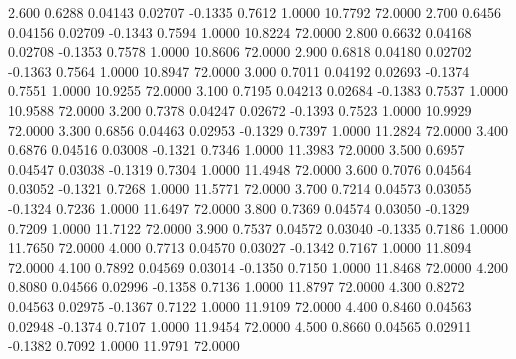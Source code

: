    2.600   0.6288   0.04143   0.02707  -0.1335   0.7612   1.0000  10.7792  72.0000
   2.700   0.6456   0.04156   0.02709  -0.1343   0.7594   1.0000  10.8224  72.0000
   2.800   0.6632   0.04168   0.02708  -0.1353   0.7578   1.0000  10.8606  72.0000
   2.900   0.6818   0.04180   0.02702  -0.1363   0.7564   1.0000  10.8947  72.0000
   3.000   0.7011   0.04192   0.02693  -0.1374   0.7551   1.0000  10.9255  72.0000
   3.100   0.7195   0.04213   0.02684  -0.1383   0.7537   1.0000  10.9588  72.0000
   3.200   0.7378   0.04247   0.02672  -0.1393   0.7523   1.0000  10.9929  72.0000
   3.300   0.6856   0.04463   0.02953  -0.1329   0.7397   1.0000  11.2824  72.0000
   3.400   0.6876   0.04516   0.03008  -0.1321   0.7346   1.0000  11.3983  72.0000
   3.500   0.6957   0.04547   0.03038  -0.1319   0.7304   1.0000  11.4948  72.0000
   3.600   0.7076   0.04564   0.03052  -0.1321   0.7268   1.0000  11.5771  72.0000
   3.700   0.7214   0.04573   0.03055  -0.1324   0.7236   1.0000  11.6497  72.0000
   3.800   0.7369   0.04574   0.03050  -0.1329   0.7209   1.0000  11.7122  72.0000
   3.900   0.7537   0.04572   0.03040  -0.1335   0.7186   1.0000  11.7650  72.0000
   4.000   0.7713   0.04570   0.03027  -0.1342   0.7167   1.0000  11.8094  72.0000
   4.100   0.7892   0.04569   0.03014  -0.1350   0.7150   1.0000  11.8468  72.0000
   4.200   0.8080   0.04566   0.02996  -0.1358   0.7136   1.0000  11.8797  72.0000
   4.300   0.8272   0.04563   0.02975  -0.1367   0.7122   1.0000  11.9109  72.0000
   4.400   0.8460   0.04563   0.02948  -0.1374   0.7107   1.0000  11.9454  72.0000
   4.500   0.8660   0.04565   0.02911  -0.1382   0.7092   1.0000  11.9791  72.0000
